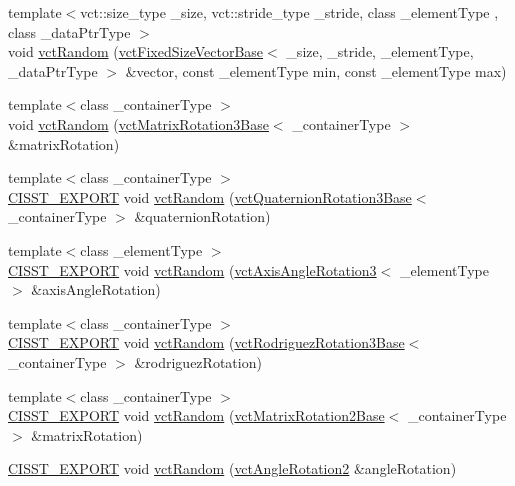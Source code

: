 \begin{DoxyCompactItemize}
\item 
{\footnotesize template$<$vct\-::size\-\_\-type \-\_\-size, vct\-::stride\-\_\-type \-\_\-stride, class \-\_\-element\-Type , class \-\_\-data\-Ptr\-Type $>$ }\\void \hyperlink{group__cisst_vector_gacf79833a14d54008ddbf8ca2216ce336}{vct\-Random} (\hyperlink{classvct_fixed_size_vector_base}{vct\-Fixed\-Size\-Vector\-Base}$<$ \-\_\-size, \-\_\-stride, \-\_\-element\-Type, \-\_\-data\-Ptr\-Type $>$ \&vector, const \-\_\-element\-Type min, const \-\_\-element\-Type max)
\end{DoxyCompactItemize}
\begin{DoxyCompactItemize}
\item 
{\footnotesize template$<$class \-\_\-container\-Type $>$ }\\void \hyperlink{group__cisst_vector_ga4021a127a6f49c8583fd1c1028dd4b8c}{vct\-Random} (\hyperlink{classvct_matrix_rotation3_base}{vct\-Matrix\-Rotation3\-Base}$<$ \-\_\-container\-Type $>$ \&matrix\-Rotation)
\item 
{\footnotesize template$<$class \-\_\-container\-Type $>$ }\\\hyperlink{cmn_export_macros_8h_a99393e0c3ac434b2605235bbe20684f8}{C\-I\-S\-S\-T\-\_\-\-E\-X\-P\-O\-R\-T} void \hyperlink{group__cisst_vector_ga12395d3b16d012b595416c41a0c4fb38}{vct\-Random} (\hyperlink{classvct_quaternion_rotation3_base}{vct\-Quaternion\-Rotation3\-Base}$<$ \-\_\-container\-Type $>$ \&quaternion\-Rotation)
\item 
{\footnotesize template$<$class \-\_\-element\-Type $>$ }\\\hyperlink{cmn_export_macros_8h_a99393e0c3ac434b2605235bbe20684f8}{C\-I\-S\-S\-T\-\_\-\-E\-X\-P\-O\-R\-T} void \hyperlink{group__cisst_vector_ga59df319896c95e38dfe204a761d89ccf}{vct\-Random} (\hyperlink{classvct_axis_angle_rotation3}{vct\-Axis\-Angle\-Rotation3}$<$ \-\_\-element\-Type $>$ \&axis\-Angle\-Rotation)
\item 
{\footnotesize template$<$class \-\_\-container\-Type $>$ }\\\hyperlink{cmn_export_macros_8h_a99393e0c3ac434b2605235bbe20684f8}{C\-I\-S\-S\-T\-\_\-\-E\-X\-P\-O\-R\-T} void \hyperlink{group__cisst_vector_gaab1f9f4cfbae501b968952c23fdbf2af}{vct\-Random} (\hyperlink{classvct_rodriguez_rotation3_base}{vct\-Rodriguez\-Rotation3\-Base}$<$ \-\_\-container\-Type $>$ \&rodriguez\-Rotation)
\item 
{\footnotesize template$<$class \-\_\-container\-Type $>$ }\\\hyperlink{cmn_export_macros_8h_a99393e0c3ac434b2605235bbe20684f8}{C\-I\-S\-S\-T\-\_\-\-E\-X\-P\-O\-R\-T} void \hyperlink{group__cisst_vector_gac57d2ebdaa710b4b9400bd7cfd3b87a2}{vct\-Random} (\hyperlink{classvct_matrix_rotation2_base}{vct\-Matrix\-Rotation2\-Base}$<$ \-\_\-container\-Type $>$ \&matrix\-Rotation)
\item 
\hyperlink{cmn_export_macros_8h_a99393e0c3ac434b2605235bbe20684f8}{C\-I\-S\-S\-T\-\_\-\-E\-X\-P\-O\-R\-T} void \hyperlink{group__cisst_vector_ga515b69d58d116cfb3465c9bb6b9e05dc}{vct\-Random} (\hyperlink{classvct_angle_rotation2}{vct\-Angle\-Rotation2} \&angle\-Rotation)
\end{DoxyCompactItemize}


